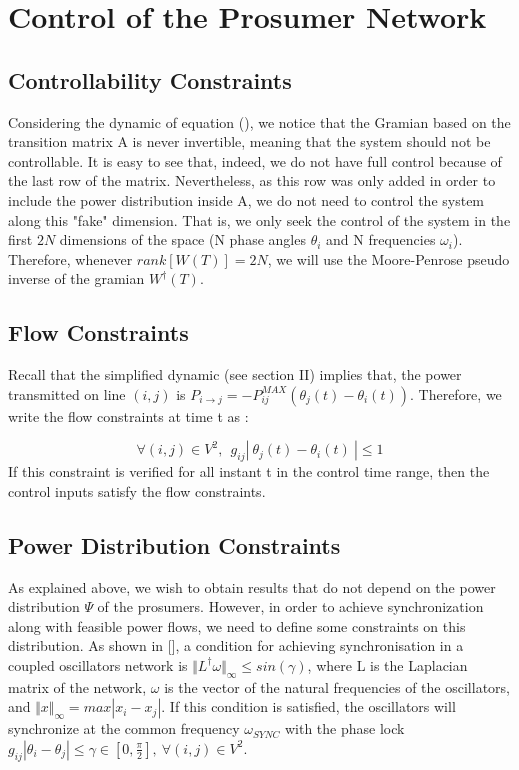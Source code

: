 \documentclass[10pt,twoside%
                ,draft%
        ]{article}
\begin{document}
\section{Control of the Prosumer Network}

\subsection{Controllability Constraints}

 Considering the dynamic of equation (), we notice that the Gramian based on the transition matrix A is never invertible, meaning that the system should not be controllable. It is easy to see that, indeed, we do not have full control because of the last row of the matrix. Nevertheless, as this row was only added in order to include the power distribution inside A, we do not need to control the system along this "fake" dimension. That is, we only seek the control of the system in the first $ 2N $ dimensions of the space (N phase angles $ \theta_i$ and N frequencies $\omega_i$). Therefore, whenever $ rank[ W(T) ] = 2N$, we will use the Moore-Penrose pseudo inverse of the gramian $ W^\dagger(T) $.


\subsection{Flow Constraints}

Recall that the simplified dynamic (see section II) implies that, the power transmitted on line $ (i,j)$ is $ P_{i \longrightarrow j} = -P_{ij}^{MAX} \left( \theta_j(t) - \theta_i(t) \right) $. Therefore, we write the flow constraints at time t as :

\begin{equation}
\forall (i,j) \in V^2,\ \ g_{ij} \left|\ \theta_j(t) - \theta_i(t)\ \right| \leq 1
\end{equation}
If this constraint is verified for all instant t in the control time range, then the control inputs satisfy the flow constraints. 



\subsection{Power Distribution Constraints}
As explained above, we wish to obtain results that do not depend on the power distribution $ \Psi $ of the prosumers. However, in order to achieve synchronization along with feasible power flows, we need to define some constraints on this distribution. As shown in [], a condition for achieving synchronisation in a coupled oscillators network is $ \Vert L^{\dagger}\omega \Vert_{\infty} \leq sin(\gamma) $, where L is the Laplacian matrix of the network, $ \omega $ is the vector of the natural frequencies of the oscillators, and $ \Vert x \Vert_{\infty} = max \left| x_i - x_j \right| $. If this condition is satisfied, the oscillators will synchronize at the common frequency $ \omega_{SYNC} $ with the phase lock $ g_{ij}\left| \theta_i - \theta_j \right| \leq    \gamma \in[0,\frac{\pi}{2}],\ \forall (i,j) \in V^2 $.
\end{document}
